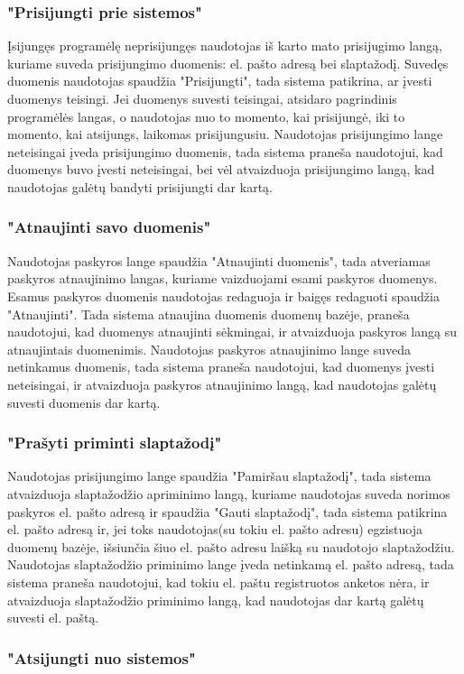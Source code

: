 \documentclass{VUMIFPSbakalaurinis}
\begin{document}
\subsubsection{"Prisijungti prie sistemos"}
Įsijungęs programėlę neprisijungęs naudotojas iš karto mato prisijugimo langą, kuriame suveda prisijungimo duomenis: el. pašto adresą bei slaptažodį. Suvedęs duomenis naudotojas spaudžia "Prisijungti", tada sistema patikrina, ar įvesti duomenys teisingi. Jei duomenys suvesti teisingai, atsidaro pagrindinis programėlės langas, o naudotojas nuo to momento, kai prisijungė, iki to momento, kai atsijungs, laikomas prisijungusiu.
Naudotojas prisijungimo lange neteisingai įveda prisijungimo duomenis, tada sistema praneša naudotojui, kad duomenys buvo įvesti neteisingai, bei vėl atvaizduoja prisijungimo langą, kad naudotojas galėtų bandyti prisijungti dar kartą.
\subsubsection{"Atnaujinti savo duomenis"}
Naudotojas paskyros lange spaudžia "Atnaujinti duomenis", tada atveriamas paskyros atnaujinimo langas, kuriame vaizduojami esami paskyros duomenys. Esamus paskyros duomenis naudotojas redaguoja ir baigęs redaguoti spaudžia "Atnaujinti". Tada sistema atnaujina duomenis duomenų bazėje, praneša naudotojui, kad duomenys atnaujinti sėkmingai, ir atvaizduoja paskyros langą su atnaujintais duomenimis.
Naudotojas paskyros atnaujinimo lange suveda netinkamus duomenis, tada sistema praneša naudotojui, kad duomenys įvesti neteisingai, ir atvaizduoja paskyros atnaujinimo langą, kad naudotojas galėtų suvesti duomenis dar kartą.
\subsubsection{"Prašyti priminti slaptažodį"}
Naudotojas prisijungimo lange spaudžia "Pamiršau slaptažodį", tada sistema atvaizduoja slaptažodžio apriminimo langą, kuriame naudotojas suveda norimos paskyros el. pašto adresą ir spaudžia "Gauti slaptažodį", tada sistema patikrina el. pašto adresą ir, jei toks naudotojas(su tokiu el. pašto adresu) egzistuoja duomenų bazėje, išsiunčia šiuo el. pašto adresu laišką su naudotojo slaptažodžiu.
Naudotojas slaptažodžio priminimo lange įveda netinkamą el. pašto adresą, tada sistema praneša naudotojui, kad tokiu el. paštu registruotos anketos nėra, ir atvaizduoja slaptažodžio priminimo langą, kad naudotojas dar kartą galėtų suvesti el. paštą.
\subsubsection{"Atsijungti nuo sistemos"}
\end{document}
